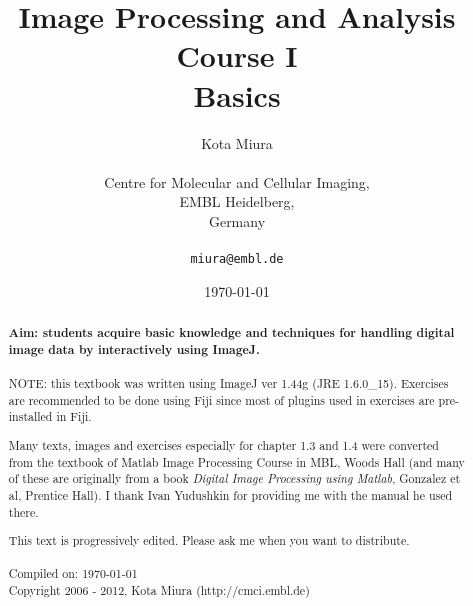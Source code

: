 \title{Image Processing and Analysis Course I\\
Basics}
\author{Kota Miura\\
\\
  Centre for Molecular and Cellular Imaging,\\
  EMBL Heidelberg,\\
  Germany\\
\\
\texttt{miura@embl.de}
}

\date{\today}

\pagestyle{empty}
\titleTH
\clearpage
\pagestyle{fancyplain}
\begin{abstract}
\HRule

\textbf{Aim: students acquire basic knowledge and techniques for handling
digital image data by interactively using ImageJ.} \\
\\

NOTE: this textbook was written using ImageJ ver 1.44g (JRE 1.6.0\_15).
Exercises are recommended to be done using Fiji since most of
plugins used in exercises are pre-installed in Fiji. 

Many texts, images
and exercises especially for chapter 1.3 and 1.4 were converted from
the textbook of Matlab Image Processing Course in MBL, Woods Hall (and many of
these are originally from a book \textit{Digital Image Processing
using Matlab}, Gonzalez et al, Prentice Hall). I
thank Ivan Yudushkin for providing me with the manual he used there. 

This text
is progressively edited. Please ask me when you want to distribute. \\
\\
Compiled on: \today \\
Copyright 2006 - 2012, Kota Miura (http://cmci.embl.de)

\HRule
\end{abstract}
